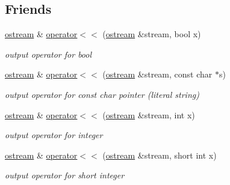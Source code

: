 \subsection*{Friends}
\begin{DoxyCompactItemize}
\item 
\mbox{\label{classhwlib_1_1ostream_a253a2e284130cc22d3dff3fbf669afae}} 
\hyperlink{classhwlib_1_1ostream}{ostream} \& \hyperlink{classhwlib_1_1ostream_a253a2e284130cc22d3dff3fbf669afae}{operator$<$$<$} (\hyperlink{classhwlib_1_1ostream}{ostream} \&stream, bool x)
\begin{DoxyCompactList}\small\item\em output operator for bool \end{DoxyCompactList}\item 
\mbox{\label{classhwlib_1_1ostream_a45bbf00f11c411f55e5eef9b28165fa6}} 
\hyperlink{classhwlib_1_1ostream}{ostream} \& \hyperlink{classhwlib_1_1ostream_a45bbf00f11c411f55e5eef9b28165fa6}{operator$<$$<$} (\hyperlink{classhwlib_1_1ostream}{ostream} \&stream, const char $\ast$s)
\begin{DoxyCompactList}\small\item\em output operator for const char pointer (literal string) \end{DoxyCompactList}\item 
\mbox{\label{classhwlib_1_1ostream_a28ee741656d0ad9d6a1782823212e7d9}} 
\hyperlink{classhwlib_1_1ostream}{ostream} \& \hyperlink{classhwlib_1_1ostream_a28ee741656d0ad9d6a1782823212e7d9}{operator$<$$<$} (\hyperlink{classhwlib_1_1ostream}{ostream} \&stream, int x)
\begin{DoxyCompactList}\small\item\em output operator for integer \end{DoxyCompactList}\item 
\mbox{\label{classhwlib_1_1ostream_a5f10f89fa98ac5e5f89cc2af0e9b0b6e}} 
\hyperlink{classhwlib_1_1ostream}{ostream} \& \hyperlink{classhwlib_1_1ostream_a5f10f89fa98ac5e5f89cc2af0e9b0b6e}{operator$<$$<$} (\hyperlink{classhwlib_1_1ostream}{ostream} \&stream, short int x)
\begin{DoxyCompactList}\small\item\em output operator for short integer \end{DoxyCompactList}\item 

\end{DoxyCompactItemize}
